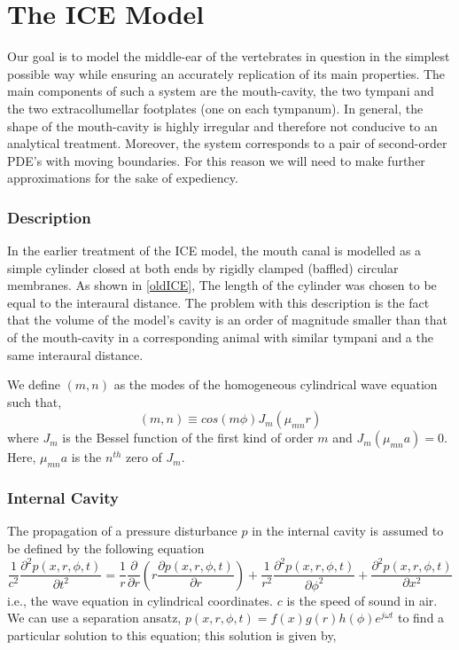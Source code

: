 \chapter{The ICE Model}

Our goal is to model the
middle-ear of the vertebrates in question in the simplest possible way while ensuring an accurately replication of its main properties. 
The main components of such a 
system are the mouth-cavity, the two tympani and the two extracollumellar
footplates (one on each tympanum). In general, the shape of the mouth-cavity is highly irregular and therefore
not conducive to an analytical treatment. Moreover, the system corresponds to a pair of second-order PDE's with
moving boundaries. For this reason we will need to make further approximations for the sake of expediency.

\subsection{Description}
In the earlier treatment of the ICE model, the mouth canal is modelled as a simple cylinder closed at 
both ends by rigidly clamped (baffled) circular membranes. As shown in \ref{oldICE}, The length of the cylinder was chosen to be equal
to the interaural distance. The problem with this description is the fact that the volume of the model's cavity 
is an order of magnitude smaller than that of the mouth-cavity in a corresponding animal with similar
tympani and a the same interaural distance.

We define $(m,n)$ as the modes of the homogeneous cylindrical wave equation such that,
\begin{equation}\label{CylindricalHarmonic}
 (m,n)\equiv cos(m\phi)J_m\left(\mu_{mn}r\right)
\end{equation}
where $J_m$ is the Bessel function of the first kind of order $m$ and $J_m\left(\mu_{mn}a\right)=0$. 
Here, $\mu_{mn}a$ is the $n^{th}$ zero of $J_m$. 

\subsection{Internal Cavity}
The propagation of a pressure disturbance $p$ in the internal cavity is assumed to be defined by the following
equation
\begin{equation}\label{CavityCylindrical}
 \frac{1}{c^2}\frac{\partial^2p(x,r,\phi,t)}{\partial t^2}=\frac{1}{r}\frac{\partial}{\partial r}\left(r\frac{\partial p(x,r,\phi,t)}{\partial r}\right)+
 \frac{1}{r^2}\frac{\partial^2 p(x,r,\phi,t)}{\partial \phi^2}+\frac{\partial^2 p(x,r,\phi,t)}{\partial x^2}
\end{equation}
i.e., the wave equation in cylindrical coordinates. $c$ is the speed of sound in air. We can use a separation
ansatz, $p(x,r,\phi,t)=f(x)g(r)h(\phi)e^{j\omega t}$ to find a particular solution
to this equation; this solution is given by,

